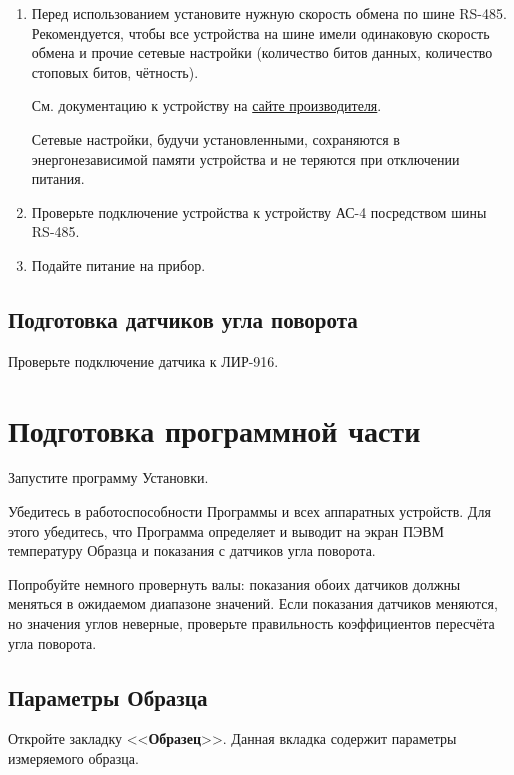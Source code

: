 \documentclass[12pt, a4paper, twocolumn]{report}
\newcommand{\CTL}[1]{<<{\bf #1}>>}
\begin{document}
\begin{enumerate}

\item Перед использованием установите нужную скорость обмена по шине RS-485. Рекомендуется, чтобы все устройства на шине имели одинаковую скорость обмена и прочие сетевые настройки (количество битов данных, количество стоповых битов, чётность).

См. документацию к устройству на \href{http://www.skbis.ru/index.php?p=3&c=8&d=56}{сайте производителя}.

Сетевые настройки, будучи установленными, сохраняются в энергонезависимой памяти устройства и не теряются при отключении питания.

\item Проверьте подключение устройства к устройству АС-4 посредством шины RS-485.

\item Подайте питание на прибор.

\end{enumerate}

\subsection{Подготовка датчиков угла поворота}

Проверьте подключение датчика к ЛИР-916.

\section{Подготовка программной части}

Запустите программу Установки.

Убедитесь в работоспособности Программы и всех аппаратных устройств. Для этого убедитесь, что Программа определяет и выводит на экран ПЭВМ температуру Образца и показания с датчиков угла поворота.

Попробуйте немного провернуть валы: показания обоих датчиков должны меняться в ожидаемом диапазоне значений. Если показания датчиков меняются, но значения углов неверные, проверьте правильность коэффициентов пересчёта угла поворота.

\subsection{Параметры Образца}

Откройте закладку \CTL{Образец}. Данная вкладка содержит параметры измеряемого образца.
\end{document}
